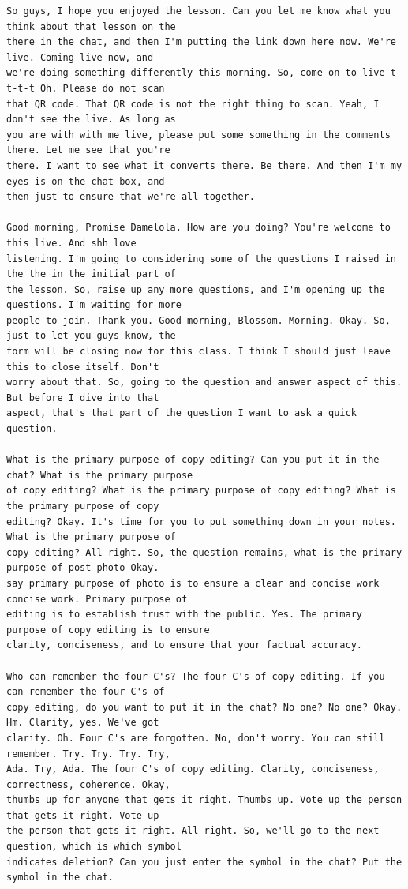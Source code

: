 {\small
\begin{Verbatim}
So guys, I hope you enjoyed the lesson. Can you let me know what you think about that lesson on the
there in the chat, and then I'm putting the link down here now. We're live. Coming live now, and
we're doing something differently this morning. So, come on to live t-t-t-t Oh. Please do not scan
that QR code. That QR code is not the right thing to scan. Yeah, I don't see the live. As long as
you are with with me live, please put some something in the comments there. Let me see that you're
there. I want to see what it converts there. Be there. And then I'm my eyes is on the chat box, and
then just to ensure that we're all together.

Good morning, Promise Damelola. How are you doing? You're welcome to this live. And shh love
listening. I'm going to considering some of the questions I raised in the the in the initial part of
the lesson. So, raise up any more questions, and I'm opening up the questions. I'm waiting for more
people to join. Thank you. Good morning, Blossom. Morning. Okay. So, just to let you guys know, the
form will be closing now for this class. I think I should just leave this to close itself. Don't
worry about that. So, going to the question and answer aspect of this. But before I dive into that
aspect, that's that part of the question I want to ask a quick question.

What is the primary purpose of copy editing? Can you put it in the chat? What is the primary purpose
of copy editing? What is the primary purpose of copy editing? What is the primary purpose of copy
editing? Okay. It's time for you to put something down in your notes. What is the primary purpose of
copy editing? All right. So, the question remains, what is the primary purpose of post photo Okay.
say primary purpose of photo is to ensure a clear and concise work concise work. Primary purpose of
editing is to establish trust with the public. Yes. The primary purpose of copy editing is to ensure
clarity, conciseness, and to ensure that your factual accuracy.

Who can remember the four C's? The four C's of copy editing. If you can remember the four C's of
copy editing, do you want to put it in the chat? No one? No one? Okay. Hm. Clarity, yes. We've got
clarity. Oh. Four C's are forgotten. No, don't worry. You can still remember. Try. Try. Try. Try,
Ada. Try, Ada. The four C's of copy editing. Clarity, conciseness, correctness, coherence. Okay,
thumbs up for anyone that gets it right. Thumbs up. Vote up the person that gets it right. Vote up
the person that gets it right. All right. So, we'll go to the next question, which is which symbol
indicates deletion? Can you just enter the symbol in the chat? Put the symbol in the chat.


\end{Verbatim}}
